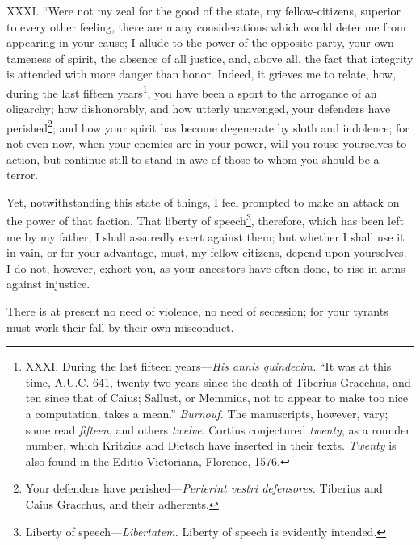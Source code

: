XXXI. ``Were not my zeal for the good of the state, my fellow-citizens,
superior to every other feeling, there are many considerations which
would deter me from appearing in your cause; I allude to the power of
the opposite party, your own tameness of spirit, the absence of all
justice, and, above all, the fact that integrity is attended with more
danger than honor. Indeed, it grieves me to relate, how, during the
last fifteen years\footnote{XXXI. During the last fifteen years—\emph{His annis quindecim.}
``It was at this time, A.U.C. 641, twenty-two years since the death of
Tiberius Gracchus, and ten since that of Caius; Sallust, or Memmius,
not to appear to make too nice a computation, takes a mean.''
\emph{Burnouf.} The manuscripts, however, vary; some read \emph{fifteen}, and
others \emph{twelve}. Cortius conjectured \emph{twenty}, as a rounder number,
which Kritzius and Dietsch have inserted in their texts. \emph{Twenty} is
also found in the Editio Victoriana, Florence, 1576.}, you have been a sport to the arrogance of an
oligarchy; how dishonorably, and how utterly unavenged, your defenders
have perished\footnote{Your defenders have perished—\emph{Perierint vestri defensores.}
Tiberius and Caius Gracchus, and their adherents.}; and how your spirit has become degenerate by sloth
and indolence; for not even now, when your enemies are in your power,
will you rouse yourselves to action, but continue still to stand in
awe of those to whom you should be a terror.

Yet, notwithstanding this state of things, I feel prompted to make an
attack on the power of that faction. That liberty of speech\footnote{Liberty of speech—\emph{Libertatem.} Liberty of speech is evidently
intended.},
therefore, which has been left me by my father, I shall assuredly
exert against them; but whether I shall use it in vain, or for your
advantage, must, my fellow-citizens, depend upon yourselves. I do not,
however, exhort you, as your ancestors have often done, to rise in
arms against injustice.

There is at present no need of violence, no need of secession; for
your tyrants must work their fall by their own misconduct.

